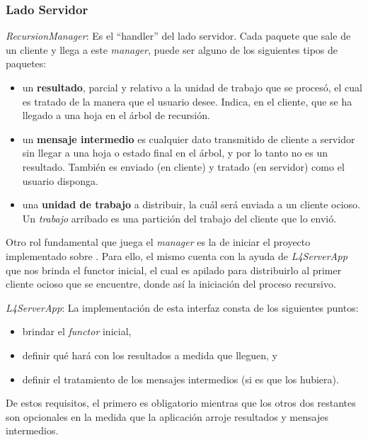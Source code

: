         \subsubsection{Lado Servidor}
					\begin{description}
            \item \textit{RecursionManager}: Es el ``handler'' del lado servidor. Cada paquete que sale de un cliente y llega a este \textit{manager},
              puede ser alguno de los siguientes tipos de paquetes:
              \begin{itemize}
                \item un \textbf{resultado}, parcial y relativo a la unidad de trabajo que se proces\'o, el cual es tratado de la manera que el usuario
                  desee. Indica, en el cliente, que se ha llegado a una hoja en el \'arbol de recursi\'on.
                \item un \textbf{mensaje intermedio} es cualquier dato transmitido de cliente a servidor sin llegar a una hoja o estado final en el
                  \'arbol, y por lo tanto no es un resultado. Tambi\'en es enviado (en cliente) y tratado (en servidor) como el usuario disponga.
                \item una \textbf{unidad de trabajo} a distribuir, la cu\'al ser\'a enviada a un cliente ocioso. Un \textit{trabajo} arribado es una
                  partici\'on del trabajo del cliente que lo envi\'o. 
              \end{itemize}
              Otro rol fundamental que juega el \textit{manager} es la de iniciar el proyecto implementado sobre \recabs. Para ello, el mismo cuenta
              con la ayuda de \textit{L4ServerApp} que nos brinda el functor inicial, el cual es apilado para distribuirlo al primer cliente ocioso
              que se encuentre, donde as\'i la iniciaci\'on del proceso recursivo.
						\item \textit{L4ServerApp}: La implementaci\'on de esta interfaz consta de los siguientes puntos:
              \begin{itemize}
                \item brindar el \textit{functor} inicial,
                \item definir qu\'e har\'a con los resultados a medida que lleguen, y
                \item definir el tratamiento de los mensajes intermedios (si es que los hubiera).
              \end{itemize}
              De estos requisitos, el primero es obligatorio mientras que los otros dos restantes son opcionales en la medida que la aplicaci\'on
              arroje resultados y mensajes intermedios.
					\end{description}

